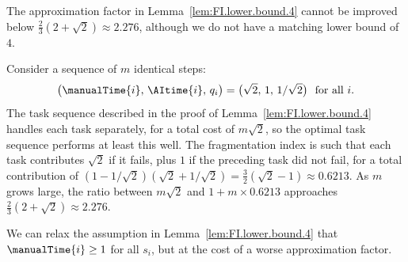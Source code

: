 The approximation factor in Lemma~\ref{lem:FI.lower.bound.4} cannot be improved below $\tfrac{2}{3}(2+\sqrt{2}) \approx 2.276$, although we do not have a matching lower bound of $4$.

\begin{example}
\label{ex:FI.lower.gap}
Consider a sequence of $m$ identical steps:
\[ \bigl(\manualTime{i},\, \AItime{i},\, q_i\bigr) = \bigl(\sqrt{2},\, 1,\, 1/\sqrt{2}\bigr) \ \text{ for all $i$}. \]
The task sequence described in the proof of Lemma~\ref{lem:FI.lower.bound.4} handles each task separately, for a total cost of $m \sqrt{2}$, so the optimal task sequence performs at least this well.
The fragmentation index is such that each task contributes $\sqrt{2}$ if it fails, plus $1$ if the preceding task did not fail, for a total contribution of $(1-1/\sqrt{2})(\sqrt{2} + 1/\sqrt{2}) = \tfrac{3}{2}(\sqrt{2}-1) \approx 0.6213$.
As $m$ grows large, the ratio between $m\sqrt{2}$ and $1 + m \times 0.6213$ approaches $\tfrac{2}{3}(2+\sqrt{2}) \approx 2.276$.
\end{example}

We can relax the assumption in Lemma~\ref{lem:FI.lower.bound.4} that $\manualTime{i} \geq 1$ for all $s_i$, but at the cost of a worse approximation factor.

